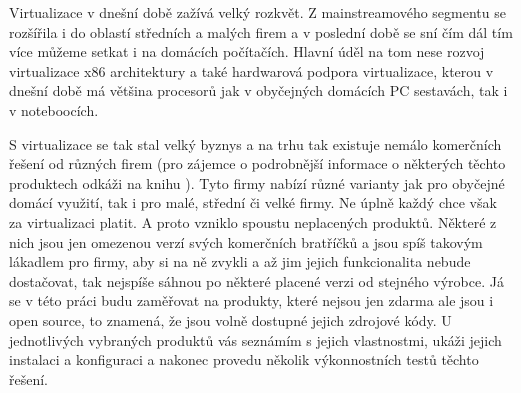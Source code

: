 Virtualizace v dnešní době zažívá velký rozkvět. Z mainstreamového segmentu se rozšířila i do oblastí středních a malých firem a v poslední době se sní čím dál tím více můžeme setkat i na domácích počítačích. Hlavní úděl na tom nese rozvoj virtualizace x86 architektury a také hardwarová podpora virtualizace, kterou v dnešní době má většina procesorů jak v obyčejných domácích PC sestavách, tak i v noteboocích.

S virtualizace se tak stal velký byznys a na trhu tak existuje nemálo komerčních řešení od různých firem (pro zájemce o podrobnější informace o některých těchto produktech odkáži na knihu \cite{hess:pract}). Tyto firmy nabízí různé varianty jak pro obyčejné domácí využití, tak i pro malé, střední či velké firmy. Ne úplně každý chce však za virtualizaci platit. A proto vzniklo spoustu neplacených produktů. Některé z nich jsou jen omezenou verzí svých komerčních bratříčků a jsou spíš takovým lákadlem pro firmy, aby si na ně zvykli a až jim jejich funkcionalita nebude dostačovat, tak nejspíše sáhnou po některé placené verzi od stejného výrobce. Já se v této práci budu zaměřovat na produkty, které nejsou jen zdarma ale jsou i open source, to znamená, že jsou volně dostupné jejich zdrojové kódy. U jednotlivých vybraných produktů vás seznámím s jejich vlastnostmi, ukáži jejich instalaci a konfiguraci a nakonec provedu několik výkonnostních testů těchto řešení.
